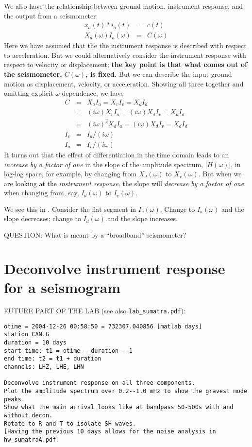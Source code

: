 \documentclass[11pt,titlepage,fleqn]{article}
\begin{document}
\begin{itemize}
We also have the relationship between ground motion, instrument response, and the output from a seismometer:
\begin{eqnarray}
x_a(t) * i_a(t) &=& c(t)
\\
X_a(\omega) I_a(\omega) &=& C(\omega)
\end{eqnarray}
%
Here we have assumed that the the instrument response is described with respect to acceleration. But we could alternatively consider the instrument response with respect to velocity or displacement; {\bf the key point is that what comes out of the seismometer, $C(\omega)$, is fixed.} But we can describe the input ground motion as displacement, velocity, or acceleration. Showing all three together and omitting explicit $\omega$ dependence, we have
%
\begin{eqnarray}
C &=& X_a I_a = X_v I_v =  X_d I_d 
\\
&=& (i\omega) X_v I_a = (i\omega) X_d I_v =  X_d I_d 
\\
&=& (i\omega)^2 X_d I_a = (i\omega) X_d I_v =  X_d I_d 
\\
I_v &=& I_d / (i\omega)
\\
I_a &=& I_v / (i\omega)
\end{eqnarray}
%
It turns out that the effect of differentiation in the time domain leads to an {\em increase by a factor of one} in the slope of the amplitude spectrum, $|H(\omega)|$, in log-log space, for example, by changing from $X_d(\omega)$ to $X_v(\omega)$. But when we are looking at the {\em instrument response}, the slope will {\em decrease by a factor of one} when changing from, say, $I_d(\omega)$ to $I_v(\omega)$.

We see this in . Consider the flat segment in $I_v(\omega)$. Change to $I_a(\omega)$ and the slope decreases; change to $I_d(\omega)$ and the slope increases.

QUESTION: What is meant by a ``broadband'' seismometer?

\end{itemize}


\section{Deconvolve instrument response for a seismogram}

FUTURE PART OF THE LAB (see also \verb+lab_sumatra.pdf+):
%
\begin{verbatim}
otime = 2004-12-26 00:58:50 = 732307.040856 [matlab days]
station CAN.G
duration = 10 days
start time: t1 = otime - duration - 1
end time: t2 = t1 + duration
channels: LHZ, LHE, LHN

Deconvolve instrument response on all three components.
Plot the amplitude spectrum over 0.2--1.0 mHz to show the gravest mode peaks.
Show what the main arrival looks like at bandpass 50-500s with and without decon.
Rotate to R and T to isolate SH waves.
[Having the previous 10 days allows for the noise analysis in hw_sumatraA.pdf]
\end{verbatim}
\end{document}

